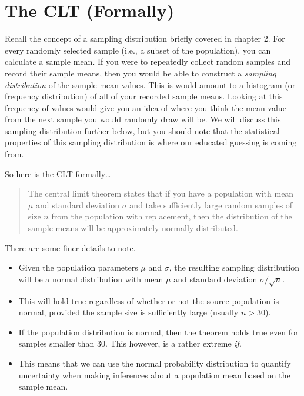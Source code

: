 \documentclass[
]{book}
\begin{document}
\hypertarget{the-clt-formally}{%
\section{The CLT (Formally)}\label{the-clt-formally}}

Recall the concept of a sampling distribution briefly covered in chapter 2. For every randomly selected sample (i.e., a subset of the population), you can calculate a sample mean. If you were to repeatedly collect random samples and record their sample means, then you would be able to construct a \emph{sampling distribution} of the sample mean values. This is would amount to a histogram (or frequency distribution) of all of your recorded sample means. Looking at this frequency of values would give you an idea of where you think the mean value from the next sample you would randomly draw will be. We will discuss this sampling distribution further below, but you should note that the statistical properties of this sampling distribution is where our educated guessing is coming from.

So here is the CLT formally\ldots{}

\begin{quote}
The central limit theorem states that if you have a population with mean \(\mu\) and standard deviation \(\sigma\) and take sufficiently large random samples of size \(n\) from the population with replacement, then the distribution of the sample means will be approximately normally distributed.
\end{quote}

There are some finer details to note.

\begin{itemize}
\item
  Given the population parameters \(\mu\) and \(\sigma\), the resulting sampling distribution will be a normal distribution with mean \(\mu\) and standard deviation \(\sigma / \sqrt{n}\).
\item
  This will hold true regardless of whether or not the source population is normal, provided the sample size is sufficiently large (usually \(n > 30\)).
\item
  If the population distribution is normal, then the theorem holds true even for samples smaller than 30. This however, is a rather extreme \emph{if}.
\item
  This means that we can use the normal probability distribution to quantify uncertainty when making inferences about a population mean based on the sample mean.
\end{itemize}
\end{document}
